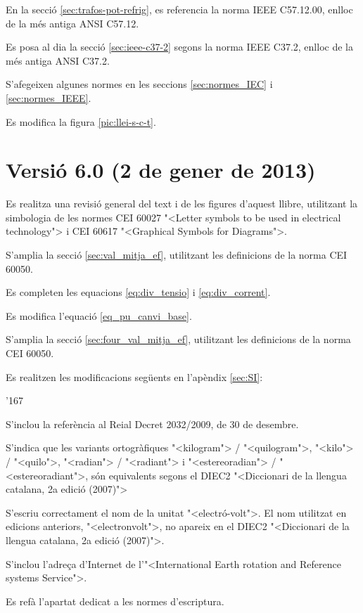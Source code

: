 En la secci\'{o} \ref{sec:trafos-pot-refrig}, es referencia la norma  \textsf{IEEE C57.12.00}, enlloc de la m\'{e}s antiga \textsf{ANSI C57.12}.

Es posa al dia la secci\'{o} \ref{sec:ieee-c37-2} segons la norma \textsf{IEEE C37.2}, enlloc de la m\'{e}s antiga \textsf{ANSI C37.2}.

S'afegeixen algunes normes en les seccions \ref{sec:normes_IEC} i \ref{sec:normes_IEEE}.

Es modifica  la figura \ref{pic:llei-s-c-t}.


\section*{Versi\'{o} 6.0 (2 de gener de 2013)}

Es realitza una revisi\'{o} general del text i de les figures d'aquest  llibre, utilitzant la simbologia de les normes \textsf{CEI 60027}  {"<}Letter symbols to be used in electrical technology{">} i  \textsf{CEI 60617}  {"<}Graphical Symbols for Diagrams{">}.

S'amplia la secci\'{o} \ref{sec:val_mitja_ef}, utilitzant les definicions de la norma \textsf{CEI 60050}.

Es completen les equacions \eqref{eq:div_tensio} i \eqref{eq:div_corrent}.

Es modifica l'equaci\'{o} \eqref{eq_pu_canvi_base}.

S'amplia la secci\'{o}  \ref{sec:four_val_mitja_ef}, utilitzant les definicions de la norma \textsf{CEI 60050}.

Es realitzen les modificacions seg\"{u}ents en l'ap\`{e}ndix \ref{sec:SI}:
\begin{dinglist}{'167}
   \item  S'inclou la refer\`{e}ncia al Reial Decret 2032/2009, de 30 de desembre.
   \item S'indica que les variants ortogr\`{a}fiques  {"<}kilogram{">}  / {"<}quilogram{">}, {"<}kilo{">} / {"<}quilo{">}, {"<}radian{">} / {"<}radiant{">} i
   {"<}estereoradian{">} / {"<}estereoradiant{">}, s\'{o}n equivalents segons el DIEC2 {"<}Diccionari de la llengua catalana, 2a edici\'{o} (2007){">}
    \item S'escriu correctament el nom de la unitat {"<}electr\'{o}-volt{">}. El nom  utilitzat en edicions anteriors,   {"<}electronvolt{">}, no apareix en el DIEC2 {"<}Diccionari de la llengua catalana, 2a edici\'{o} (2007){">}.
    \item S'inclou l'adre\c{c}a d'Internet de l'{"<}International Earth rotation and Reference systems Service{">}.
     \item Es ref\`{a} l'apartat dedicat a les normes d'escriptura.
\end{dinglist}

